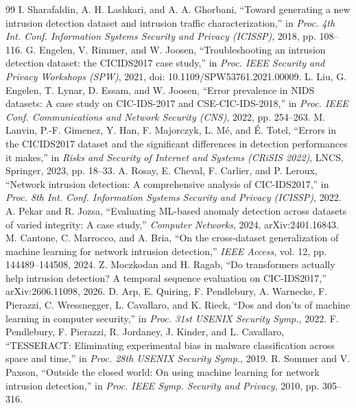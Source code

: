 \documentclass[conference]{IEEEtran}
\begin{document}
\balance
\begin{thebibliography}{99}
\footnotesize
{} I. Sharafaldin, A. H. Lashkari, and A. A. Ghorbani, ``Toward generating a new intrusion detection dataset and intrusion traffic characterization,'' in \textit{Proc. 4th Int. Conf. Information Systems Security and Privacy (ICISSP)}, 2018, pp. 108--116.
 G. Engelen, V. Rimmer, and W. Joosen, ``Troubleshooting an intrusion detection dataset: the CICIDS2017 case study,'' in \textit{Proc. IEEE Security and Privacy Workshops (SPW)}, 2021, doi: 10.1109/SPW53761.2021.00009.
 L. Liu, G. Engelen, T. Lynar, D. Essam, and W. Joosen, ``Error prevalence in NIDS datasets: A case study on CIC-IDS-2017 and CSE-CIC-IDS-2018,'' in \textit{Proc. IEEE Conf. Communications and Network Security (CNS)}, 2022, pp. 254--263.
 M. Lanvin, P.-F. Gimenez, Y. Han, F. Majorczyk, L. M\'e, and \'E. Totel, ``Errors in the CICIDS2017 dataset and the significant differences in detection performances it makes,'' in \textit{Risks and Security of Internet and Systems (CRiSIS 2022)}, LNCS, Springer, 2023, pp. 18--33.
 A. Rosay, E. Cheval, F. Carlier, and P. Leroux, ``Network intrusion detection: A comprehensive analysis of CIC-IDS2017,'' in \textit{Proc. 8th Int. Conf. Information Systems Security and Privacy (ICISSP)}, 2022.
 A. Pekar and R. Jozsa, ``Evaluating ML-based anomaly detection across datasets of varied integrity: A case study,'' \textit{Computer Networks}, 2024, arXiv:2401.16843.
 M. Cantone, C. Marrocco, and A. Bria, ``On the cross-dataset generalization of machine learning for network intrusion detection,'' \textit{IEEE Access}, vol. 12, pp. 144489--144508, 2024.
 Z. Moczkodan and H. Ragab, ``Do transformers actually help intrusion detection? A temporal sequence evaluation on CIC-IDS2017,'' arXiv:2606.11098, 2026.
 D. Arp, E. Quiring, F. Pendlebury, A. Warnecke, F. Pierazzi, C. Wressnegger, L. Cavallaro, and K. Rieck, ``Dos and don'ts of machine learning in computer security,'' in \textit{Proc. 31st USENIX Security Symp.}, 2022.
 F. Pendlebury, F. Pierazzi, R. Jordaney, J. Kinder, and L. Cavallaro, ``TESSERACT: Eliminating experimental bias in malware classification across space and time,'' in \textit{Proc. 28th USENIX Security Symp.}, 2019.
 R. Sommer and V. Paxson, ``Outside the closed world: On using machine learning for network intrusion detection,'' in \textit{Proc. IEEE Symp. Security and Privacy}, 2010, pp. 305--316.

\end{thebibliography}
\end{document}
